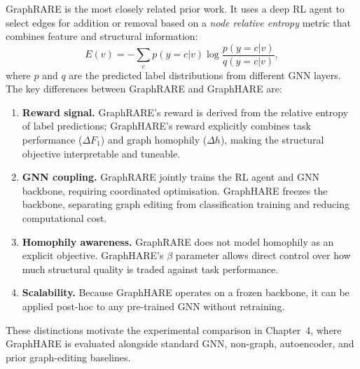 GraphRARE \cite{graphrare2024} is the most closely related prior work. It uses a deep
RL agent to select edges for addition or removal based on a \textit{node relative entropy}
metric that combines feature and structural information:
\begin{equation}
    E(v) = -\sum_{c} p(y=c|v) \log \frac{p(y=c|v)}{q(y=c|v)},
\end{equation}
where $p$ and $q$ are the predicted label distributions from different GNN layers.
The key differences between GraphRARE and GraphHARE are:

\begin{enumerate}
    \item \textbf{Reward signal.} GraphRARE's reward is derived from the relative entropy
    of label predictions; GraphHARE's reward explicitly combines task performance ($\Delta F_1$)
    and graph homophily ($\Delta h$), making the structural objective interpretable and tuneable.

    \item \textbf{GNN coupling.} GraphRARE jointly trains the RL agent and GNN backbone,
    requiring coordinated optimisation. GraphHARE freezes the backbone, separating graph
    editing from classification training and reducing computational cost.

    \item \textbf{Homophily awareness.} GraphRARE does not model homophily as an explicit
    objective. GraphHARE's $\beta$ parameter allows direct control over how much structural
    quality is traded against task performance.

    \item \textbf{Scalability.} Because GraphHARE operates on a frozen backbone, it can be
    applied post-hoc to any pre-trained GNN without retraining.
\end{enumerate}

These distinctions motivate the experimental comparison in Chapter~4, where GraphHARE is
evaluated alongside standard GNN, non-graph, autoencoder, and prior graph-editing baselines.
